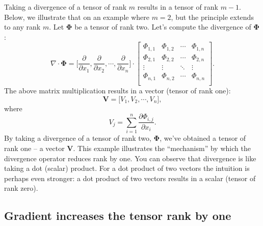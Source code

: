 \documentclass[10pt,twocolumn]{article}
\begin{document}
Taking a divergence of a tensor of rank $m$ results in a tensor of rank $m-1$. Below, we illustrate that on an example where $m=2$, but the principle extends to any rank $m$. Let $\pmb{\Phi}$ be a tensor of rank two. Let's compute the divergence of $\pmb{\Phi}$:
\begin{equation*}
  \nabla \cdot \pmb{\Phi} =
  \Big[ \frac{\partial}{\partial x_1} , \frac{\partial}{\partial x_2}, \cdots , \frac{\partial}{\partial x_n} \Big]
  \cdot
  \begin{bmatrix}
  \Phi_{1,1} & \Phi_{1,2} & \cdots & \Phi_{1,n} \\
  \Phi_{2,1} & \Phi_{2,2} & \cdots & \Phi_{2,n}\\
  \vdots & \vdots & \ddots & \vdots \\
   \Phi_{n,1} & \Phi_{n,2} & \cdots & \Phi_{n,n} \\
  \end{bmatrix}.
\end{equation*}
The above matrix multiplication results in a vector (tensor of rank one):
\begin{equation*}
\mathbf{V} =  \Big[V_1, V_2, \cdots ,  V_n \Big] ,
\end{equation*}
where
\begin{equation*}
V_j = \sum_{i=1}^n \frac{\partial \Phi_{i,j}}{\partial x_i}.
\end{equation*}
By taking a divergence of a tensor of rank two, $\pmb{\Phi}$, we've obtained a tensor of rank one -- a vector $\mathbf{V}$. This example  illustrates the ``mechanism'' by which the divergence operator reduces rank by one. You can observe that divergence is like taking a dot (scalar) product. For a dot product of two vectors the intuition is perhaps even stronger: a dot product of two vectors results in a scalar (tensor of rank zero). 

\subsection*{Gradient increases the tensor rank by one}
\end{document}
